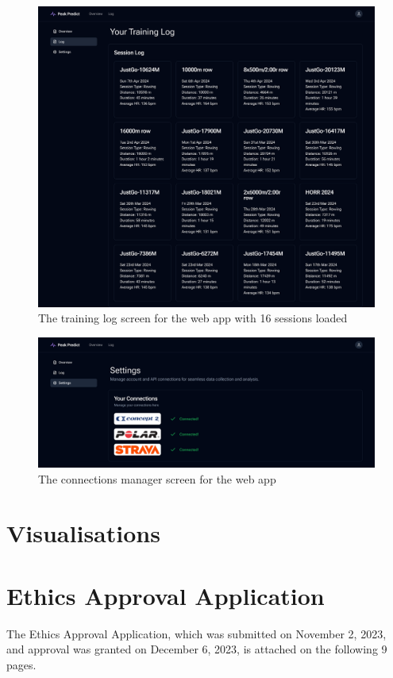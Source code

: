 \begin{figure}[!hp]
  \centering
  \includegraphics[width=\textwidth]{figures/fyp_training_log.png}
  \captionsetup{justification=centering}
  \caption*{The training log screen for the web app with 16 sessions loaded} \label{fig:app_webapp_training_log}
\end{figure}
\begin{figure}[!hp]
  \centering
  \includegraphics[width=\textwidth]{figures/fyp_connections_page.png}
  \captionsetup{justification=centering}
  \caption*{\label{fig:app_webapp_connection_mgr}The connections manager screen for the web app} 
\end{figure}

\newpage
\section{Visualisations}


\newpage
\section{\label{sec:ethics-approval-application}Ethics Approval Application}
The Ethics Approval Application, which was submitted on November 2, 2023, and approval was granted on December 6, 2023, is attached on the following 9 pages.
